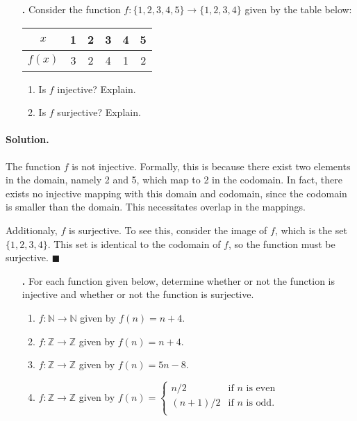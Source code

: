 \documentclass[12pt]{article}
\newenvironment{exercise}
  {\begin{enumerate}[left=0pt] \item[\textbf{\theexercise.}]}
  {\end{enumerate} \stepcounter{exercise}}
\newenvironment{solution}{\paragraph{Solution.}}{\hfill$\blacksquare$}
\newcommand{\N}{\mathbb{N}}
\newcommand{\Z}{\mathbb{Z}}
\begin{document}
\begin{exercise}
  Consider the function $f : \{1, 2, 3, 4, 5\} \to \{1, 2, 3, 4\}$ given by the
  table below:

  \begin{center}
    \begin{tabular}{c||c|c|c|c|c}
      $x$    & 1 & 2 & 3 & 4 & 5 \\ \hline
      $f(x)$ & 3 & 2 & 4 & 1 & 2 \\
    \end{tabular}
  \end{center}

  \begin{enumerate}[label=(\alph*)]
    \item Is $f$ injective? Explain.
    \item Is $f$ surjective? Explain.
  \end{enumerate}
\end{exercise}

\begin{solution}
  The function $f$ is not injective. Formally, this is because there exist two
  elements in the domain, namely 2 and 5, which map to 2 in the codomain. In
  fact, there exists no injective mapping with this domain and codomain, since
  the codomain is smaller than the domain. This necessitates overlap in the
  mappings.

  Additionaly, $f$ is surjective. To see this, consider the image of $f$, which
  is the set $\{1, 2, 3, 4\}$. This set is identical to the codomain of $f$, so
  the function must be surjective.
\end{solution}

\begin{exercise}
  For each function given below, determine whether or not the function is
  injective and whether or not the function is surjective.

  \begin{enumerate}[label=(\alph*)]
    \item $f : \N \to \N$ given by $f(n) = n + 4$.
    \item $f : \Z \to \Z$ given by $f(n) = n + 4$.
    \item $f : \Z \to \Z$ given by $f(n) = 5n - 8$.
    \item $f : \Z \to \Z$ given by $f(n) =
      \begin{cases}
        n/2       & \text{if $n$ is even} \\
        (n + 1)/2 & \text{if $n$ is odd.} \\
      \end{cases}$
  \end{enumerate}
\end{exercise}
\end{document}
